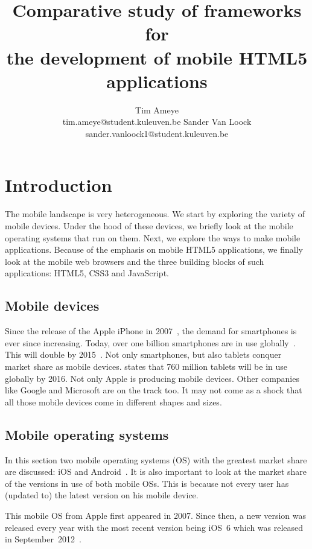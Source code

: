\documentclass[a4paper]{artikel3}
\title{Comparative study of frameworks for \\ the development of mobile HTML5 applications}
\author{Tim Ameye \\ tim.ameye@student.kuleuven.be \And Sander Van Loock \\ sander.vanloock1@student.kuleuven.be}
\renewcommand{\paragraph}[1]{\vspace{2mm} \noindent {\bf #1}  }
\begin{document}
\maketitle


\section{Introduction} %
\label{sec:introduction}
The mobile landscape is very heterogeneous.
We start by exploring the variety of mobile devices.
Under the hood of these devices, we briefly look at the mobile operating systems that run on them. 
Next, we explore the ways to make mobile applications.
Because of the emphasis on mobile HTML5 applications, we finally look at the mobile web browsers and the three building blocks of such applications: HTML5, CSS3 and JavaScript.

\subsection{Mobile devices}
Since the release of the Apple iPhone in 2007~\cite{David2011}, the demand for smartphones is ever since increasing. 
Today, over one billion smartphones are in use globally~\cite{Yang2012}.
This will double by 2015~\cite{Gillett2012}.
Not only smartphones, but also tablets conquer market share as mobile devices.
\cite{Gillett2012} states that 760 million tablets will be in use globally by 2016.
Not only Apple is producing mobile devices.
Other companies like Google and Microsoft are on the track too.
It may not come as a shock that all those mobile devices come in different shapes and sizes.


\subsection{Mobile operating systems}
In this section two mobile operating systems (OS) with the greatest market share are discussed: iOS and Android~\cite{David2011, Hales2012}.
It is also important to look at the market share of the versions in use of both mobile OSs.
This is because not every user has (updated to) the latest version on his mobile device.

\paragraph{iOS}
This mobile OS from Apple first appeared in 2007.
Since then, a new version was released every year with the most recent version being iOS~6 which was released in September~2012~\cite{Deitel2012, PhilDutson2012}.
 
\end{document}
